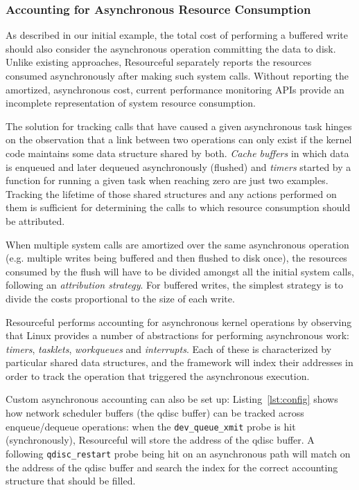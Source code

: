 \documentclass[12pt,twoside,a4paper]{article}
\newcommand{\pname}{Resourceful}
\begin{document}
\subsubsection*{Accounting for Asynchronous Resource Consumption}
As described in our initial example, the total cost of performing a buffered
write should also consider the asynchronous operation committing the data to
disk. Unlike existing approaches, \pname{} separately reports the resources
consumed asynchronously after making such system calls.  Without reporting the
amortized, asynchronous cost, current performance monitoring APIs provide an
incomplete representation of system resource consumption.

The solution for tracking calls that have caused a given asynchronous task
hinges on the observation that a link between two operations can only exist if
the kernel code maintains some data structure shared by both. \textit{Cache
buffers} in which data is enqueued and later dequeued asynchronously (flushed)
and \textit{timers} started by a function for running a given task when reaching
zero are just two examples. Tracking the lifetime of those shared structures and
any actions performed on them is sufficient for determining the calls to which
resource consumption should be attributed.

When multiple system calls are amortized over the same asynchronous operation
(e.g. multiple writes being buffered and then flushed to disk once),
the resources consumed by the flush will have to be divided amongst all the
initial system calls, following an \textit{attribution strategy}. For buffered writes,
the simplest strategy is to divide the costs proportional to the size of each
write.

\pname{ }performs accounting for asynchronous kernel operations by observing
that Linux provides a number of abstractions for performing asynchronous work:
\emph{timers}, \emph{tasklets}, \emph{workqueues} and \emph{interrupts}. Each of
these is characterized by particular shared data structures, and the framework
will index their addresses in order to track the operation that triggered the
asynchronous execution.

Custom asynchronous accounting can also be set up: Listing~\ref{lst:config}
shows how network scheduler buffers (the qdisc buffer) can be tracked across
enqueue/dequeue operations: when the \texttt{dev\_queue\_xmit} probe is hit
(synchronously), \pname{ }will store the address of the qdisc buffer. A
following \texttt{qdisc\_restart} probe being hit on an asynchronous path will
match on the address of the qdisc buffer and search the index for the correct
accounting structure that should be filled.
\end{document}
